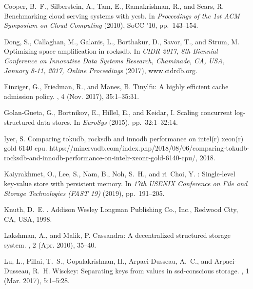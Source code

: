 \documentclass[sigplan,10pt]{acmart}
\begin{document}
\begin{thebibliography}{10}
{\sc Cooper, B.~F., Silberstein, A., Tam, E., Ramakrishnan, R., and Sears, R.}
\newblock Benchmarking cloud serving systems with ycsb.
\newblock In {\em Proceedings of the 1st ACM Symposium on Cloud Computing\/}
  (2010), SoCC '10, pp.~143--154.

{\sc Dong, S., Callaghan, M., Galanis, L., Borthakur, D., Savor, T., and Strum,
  M.}
\newblock Optimizing space amplification in rocksdb.
\newblock In {\em {CIDR} 2017, 8th Biennial Conference on Innovative Data
  Systems Research, Chaminade, CA, USA, January 8-11, 2017, Online
  Proceedings\/} (2017), www.cidrdb.org.

{\sc Einziger, G., Friedman, R., and Manes, B.}
\newblock Tinylfu: A highly efficient cache admission policy.
, 4 (Nov. 2017), 35:1--35:31.

{\sc Golan-Gueta, G., Bortnikov, E., Hillel, E., and Keidar, I.}
\newblock Scaling concurrent log-structured data stores.
\newblock In {\em {EuroSys}\/} (2015), pp.~32:1--32:14.

{\sc Iyer, S.}
\newblock Comparing tokudb, rocksdb and innodb performance on intel(r) xeon(r)
  gold 6140 cpu.
\newblock
  https://minervadb.com/index.php/2018/08/06/comparing-tokudb-rocksdb-and-innodb-performance-on-intelr-xeonr-gold-6140-cpu/,
  2018.

{\sc Kaiyrakhmet, O., Lee, S., Nam, B., Noh, S.~H., and ri~Choi, Y.}
: Single-level key-value store with persistent memory.
\newblock In {\em 17th {USENIX} Conference on File and Storage Technologies
  ({FAST} 19)\/} (2019), pp.~191--205.

{\sc Knuth, D.~E.}
.
\newblock Addison Wesley Longman Publishing Co., Inc., Redwood City, CA, USA,
  1998.

{\sc Lakshman, A., and Malik, P.}
\newblock Cassandra: A decentralized structured storage system.
, 2 (Apr. 2010), 35--40.

{\sc Lu, L., Pillai, T.~S., Gopalakrishnan, H., Arpaci-Dusseau, A.~C., and
  Arpaci-Dusseau, R.~H.}
\newblock Wisckey: Separating keys from values in ssd-conscious storage.
, 1 (Mar. 2017), 5:1--5:28.


\end{thebibliography}
\end{document}
